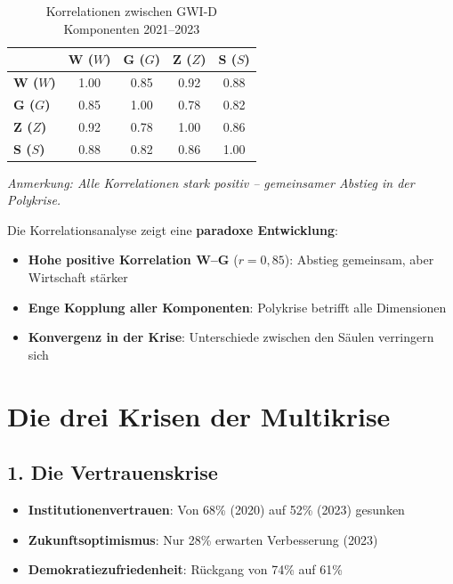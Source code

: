 \begin{table}[ht]
    \centering
    \caption{Korrelationen zwischen GWI-D Komponenten 2021–2023}
    \label{tab:korrelation_multikrise}
    \begin{tabular}{lcccc}
        \toprule
        & \textbf{W (\(W\))} & \textbf{G (\(G\))} & \textbf{Z (\(Z\))} & \textbf{S (\(S\))} \\
        \midrule
        \textbf{W (\(W\))} & 1.00 & 0.85 & 0.92 & 0.88 \\
        \textbf{G (\(G\))} & 0.85 & 1.00 & 0.78 & 0.82 \\
        \textbf{Z (\(Z\))} & 0.92 & 0.78 & 1.00 & 0.86 \\
        \textbf{S (\(S\))} & 0.88 & 0.82 & 0.86 & 1.00 \\
        \bottomrule
    \end{tabular}
\end{table}

\begin{flushleft}
\footnotesize{\textit{Anmerkung: Alle Korrelationen stark positiv – gemeinsamer Abstieg in der Polykrise.}}
\end{flushleft}

Die Korrelationsanalyse zeigt eine \textbf{paradoxe Entwicklung}:

\begin{itemize}
    \item \textbf{Hohe positive Korrelation W–G} (\(r = 0,85\)): Abstieg gemeinsam, aber Wirtschaft stärker
    \item \textbf{Enge Kopplung aller Komponenten}: Polykrise betrifft alle Dimensionen
    \item \textbf{Konvergenz in der Krise}: Unterschiede zwischen den Säulen verringern sich
\end{itemize}

\section{Die drei Krisen der Multikrise}

\subsection{1. Die Vertrauenskrise}

\begin{itemize}
    \item \textbf{Institutionenvertrauen}: Von 68\% (2020) auf 52\% (2023) gesunken
    \item \textbf{Zukunftsoptimismus}: Nur 28\% erwarten Verbesserung (2023)
    \item \textbf{Demokratiezufriedenheit}: Rückgang von 74\% auf 61\%
\end{itemize}


